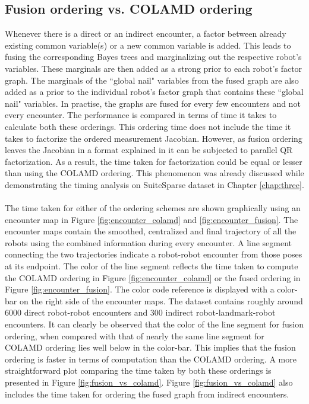 \subsection{Fusion ordering vs. COLAMD ordering}
Whenever there is a direct or an indirect encounter, a factor between already existing common variable(s) or a new common variable is added. This leads to fusing the corresponding Bayes trees and marginalizing out the respective robot's variables. These marginals are then added as a strong prior to each robot's factor graph. The marginals of the ``global nail" variables from the fused graph are also added as a prior to the individual robot's factor graph that contains these ``global nail" variables. In practise, the graphs are fused for every few encounters and not every encounter. The performance is compared in terms of time it takes to calculate both these orderings. This ordering time does not include the time it takes to factorize the ordered measurement Jacobian. However, as fusion ordering leaves the Jacobian in a format explained in \cite{parallelqr} it can be subjected to parallel QR factorization. As a result, the time taken for factorization could be equal or lesser than using the COLAMD ordering. This phenomenon was already discussed while demonstrating the timing analysis on SuiteSparse dataset in Chapter \ref{chap:three}. 
\paragraph{}
The time taken for either of the ordering schemes are shown graphically using an encounter map in Figure \ref{fig:encounter_colamd} and \ref{fig:encounter_fusion}. The encounter maps contain the smoothed, centralized and final trajectory of all the robots using the combined information during every encounter. A line segment connecting the two trajectories indicate a robot-robot encounter from those poses at its endpoint. The color of the line segment reflects the time taken to compute the COLAMD ordering in Figure \ref{fig:encounter_colamd} or the fused ordering in Figure \ref{fig:encounter_fusion}. The color code reference is displayed with a color-bar on the right side of the encounter maps. The dataset contains roughly around 6000 direct robot-robot encounters and 300 indirect robot-landmark-robot encounters. It can clearly be observed that the color of the line segment for fusion ordering, when compared with that of nearly the same line segment for COLAMD ordering lies well below in the color-bar. This implies that the fusion ordering is faster in terms of computation than the COLAMD ordering. A more straightforward plot comparing the time taken by both these orderings is presented in Figure \ref{fig:fusion_vs_colamd}. Figure \ref{fig:fusion_vs_colamd} also includes the time taken for ordering the fused graph from indirect encounters.

